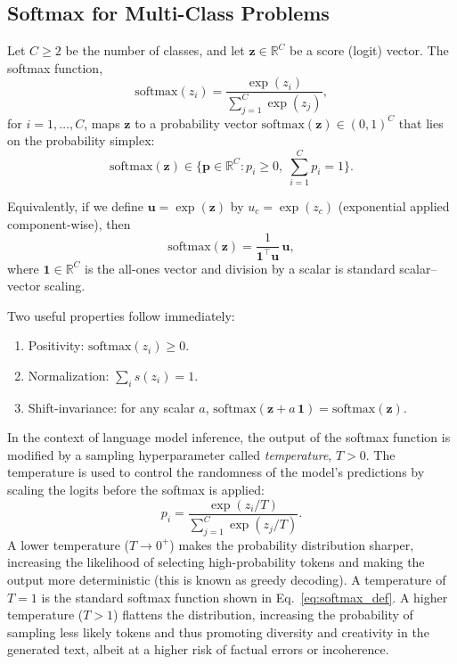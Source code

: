 \documentclass[%
  reprint,
  superscriptaddress,
  showpacs,
  showkeys,
  amsmath,amssymb,
  pra,
  longbibliography,
  floatfix,
  x11names
]{revtex4-2}
\begin{document}
\subsection{Softmax for Multi-Class Problems}


Let $C\ge 2$ be the number of classes, and let $\bm{z}\in\mathbb{R}^C$ be a score (logit) vector.
The softmax function,
\begin{equation}
\mathrm{softmax}(z_i)= \frac{\exp(z_i)}{\displaystyle\sum_{j=1}^C \exp(z_j)},
\label{eq:softmax_def}
\end{equation}
for $i=1,\dots,C$,
maps $\bm{z}$ to a probability vector $\mathrm{softmax} (\bm{z}) \in(0,1)^C$ that lies on the probability simplex:
\begin{equation}
\mathrm{softmax}(\bm{z})  \in
\Big\{\bm{p}\in\mathbb{R}^C: p_i\ge 0,\; \sum_{i=1}^C p_i = 1\Big\}.
\end{equation}

Equivalently, if we define $\bm{u}=\exp(\bm{z})$ by $u_c=\exp(z_c)$ (exponential applied component-wise), then
\begin{equation}
\mathrm{softmax}(\bm{z}) = \frac{1}{\bm{1}^\intercal \bm{u}}\,\bm{u},
\end{equation}
where $\bm{1}\in\mathbb{R}^C$ is the all-ones vector and division by a scalar is standard scalar--vector scaling.

Two useful properties follow immediately:
\begin{enumerate}
    \item Positivity: $\mathrm{softmax}( {z}_i)\ge 0$.
    \item Normalization:  $\sum_i s( {z}_i)=1$.
    \item Shift-invariance: for any scalar $a$, $\mathrm{softmax}(\bm{z}+a\,\bm{1})=\mathrm{softmax}(\bm{z})$.
\end{enumerate}

In the context of language model inference, the output of the softmax function is modified by a sampling hyperparameter called \emph{temperature}, $T>0$. The temperature is used to control the randomness of the model's predictions by scaling the logits before the softmax is applied:
\begin{equation}
p_i = \frac{\exp(z_i/T)}{\displaystyle\sum_{j=1}^C \exp(z_j/T)}.
\label{eq:softmax_temp}
\end{equation}
A lower temperature ($T \to 0^+$) makes the probability distribution sharper, increasing the likelihood of selecting high-probability tokens and making the output more deterministic (this is known as greedy decoding). A temperature of $T=1$ is the standard softmax function shown in Eq.~\eqref{eq:softmax_def}. A higher temperature ($T > 1$) flattens the distribution, increasing the probability of sampling less likely tokens and thus promoting diversity and creativity in the generated text, albeit at a higher risk of factual errors or incoherence.
\end{document}
